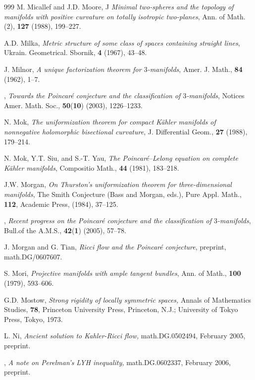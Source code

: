 \begin{thebibliography}{999}
 M. Micallef and J.D. Moore, J
{\it Minimal two-spheres and the topology of manifolds with
positive curvature on totally isotropic two-planes}, Ann. of Math.
(2), {\bf 127} (1988), 199--227.

 A.D. Milka,
{\it Metric structure of some class of spaces containing straight
lines}, Ukrain. Geometrical. Sbornik, \textbf{4} (1967), 43--48.

 J. Milnor,
{\it A unique factorization theorem for $3$-manifolds}, Amer. J.
Math., \textbf{84} (1962), 1--7.

 \bysame,
{\it Towards the Poincar\'e conjecture and the classification of
$3$-manifolds}, Notices Amer. Math. Soc., {\bf 50}({\bf 10})
(2003), 1226--1233.

 N. Mok,
{\it The uniformization theorem for compact K\"ahler manifolds of
nonnegative holomorphic bisectional curvature}, J. Differential
Geom., {\bf 27} (1988), 179--214.

 N. Mok, Y.T. Siu, and S.-T. Yau,
{\it The Poincar\'e--Lelong equation on complete K\"ahler
manifolds}, Compositio Math., {\bf 44} (1981), 183--218.

 J.W. Morgan,
{\it On Thurston's uniformization theorem for three-dimensional
manifolds}, The Smith Conjecture (Bass and Morgan, eds.), Pure
Appl. Math., \textbf{112}, Academic Press, (1984), 37--125.

 \bysame,
{\it Recent progress on the Poincar\'{e} conjecture and the
classification of $3$-manifolds}, Bull.of the A.M.S., {\bf
42}({\bf 1}) (2005), 57--78.

 J. Morgan and G. Tian,
{\it  Ricci flow and the Poincar\'e conjecture}, preprint,
math.DG/0607607.

 S. Mori,
{\it Projective manifolds with ample tangent bundles}, Ann. of
Math., {\bf 100} (1979), 593--606.

 G.D. Mostow,
{\it  Strong rigidity of locally symmetric spaces,} Annals of
Mathematics Studies, \textbf{78}, Princeton University Press,
Princeton, N.J.; University of Tokyo Press, Tokyo, 1973.

 L. Ni,
{\it Ancient solution to Kahler-Ricci flow,} math.DG.0502494,
February 2005, preprint.

 \bysame,
{\it A note on Perelman's LYH inequality,} math.DG.0602337,
February 2006, preprint.


\end{thebibliography}
